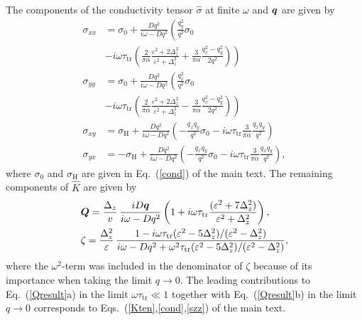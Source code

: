 The components of the conductivity tensor $\hat{\sigma}$ at finite $\omega$ and $\boldsymbol{q}$ are given by
\beml
\label{chap1:eq:sconductivity}
\begin{align}
  \sigma_{xx} &= \sigma_0+\frac{Dq^2}{i\omega-Dq^2}\left(\frac{q_y^2}{q^2} \sigma_0\right.\nonumber\\
  & \left.-i\omega \tau_\text{tr}\left(\frac{2}{\pi\alpha}\frac{\varepsilon^2+2\Delta_z^2}{\varepsilon^2+\Delta_z^2}+\frac{3}{\pi\alpha}\frac{q_{x}^2-q_{y}^2}{2q^2}\right)\right)\\
  \sigma_{yy} &=  \sigma_0+\frac{Dq^2}{i\omega-Dq^2}\left(\frac{q_x^2}{q^2} \sigma_0\right.\nonumber\\
    &\left.-i\omega \tau_\text{tr}\left(\frac{2}{\pi\alpha}\frac{\varepsilon^2+2\Delta_z^2}{\varepsilon^2+\Delta_z^2}-\frac{3}{\pi\alpha}\frac{q_{x}^2-q_{y}^2}{2q^2}\right)\right)\\
    \sigma_{xy} &= \sigma_\textrm{H}+\frac{Dq^2}{i\omega-Dq^2}\left(-\frac{q_xq_y}{q^2} \sigma_0-i\omega\tau_\text{tr}\frac{3}{\pi\alpha}\frac{q_xq_y}{q^2}\right)\\
  \sigma_{yx} &= -\sigma_\textrm{H}+\frac{Dq^2}{i\omega-Dq^2}\left(-\frac{q_xq_y}{q^2} \sigma_0-i\omega\tau_\text{tr}\frac{3}{\pi\alpha}\frac{q_xq_y}{q^2}\right),
\end{align}
\eml
where $\sigma_0$ and $\sigma_\textrm{H}$ are given in Eq.~(\ref{cond}) of the main text. 
The remaining components of $\hat{K}$ are given by
\beml
\label{Qresult}
\begin{align}
&\boldsymbol{Q}=\frac{\Delta_z}{ v}\, \frac{i D \boldsymbol{q}}{i\omega-Dq^2}
\left(1+i\omega\tau_\text{tr}\frac{(\varepsilon^2+7\Delta_z^2)}{\varepsilon^2+\Delta_z^2}\right),\\
&\zeta=\frac{\Delta_z^2}{ \varepsilon}\,\frac{1-i\omega\tau_\text{tr}(\varepsilon^2-5\Delta_z^2)/(\varepsilon^2-\Delta_z^2)}{i\omega-Dq^2+\omega^2\tau_\text{tr}(\varepsilon^2-5\Delta_z^2)/(\varepsilon^2-\Delta_z^2)}
,
\end{align}
\eml
 where the $\omega^2$-term was included in the denominator of $\zeta$ because of its importance when taking the limit $q\rightarrow 0$.
The leading contributions to Eq.~(\ref{Qresult}a) in the limit $\omega\tau_\text{tr}\ll 1$ together with Eq.~(\ref{Qresult}b) in the limit $q\rightarrow0$ corresponds to Eqs.~(\ref{Kten},\ref{cond},\ref{szz}) of the main text. 


